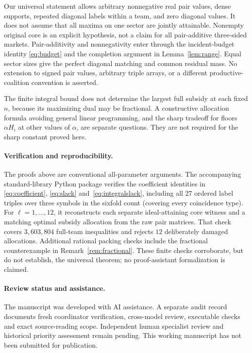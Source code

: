 \documentclass[11pt]{article}
\theoremstyle{remark}
\begin{document}
Our universal statement allows arbitrary nonnegative real pair values,
dense supports, repeated diagonal labels within a team, and zero diagonal
values. It does not assume that all maxima on one sector are jointly
attainable. Nonempty original core is an explicit hypothesis, not a
claim for all pair-additive three-sided markets. Pair-additivity and
nonnegativity enter through the incident-budget identity
\eqref{eq:budget} and the completion argument in Lemma~\ref{lem:range}.
Equal sector sizes give the perfect diagonal matching and common residual
mass. No extension to signed pair values, arbitrary triple arrays, or a
different productive-coalition convention is asserted.

The finite integral bound does not determine the largest full subsidy at
each fixed $n$, because its maximizing dual may be fractional. A constructive
allocation formula avoiding general linear programming, and the sharp
tradeoff for floors $\alpha H_i$ at other values of $\alpha$, are separate
questions. They are not required for the sharp constant proved here.

\paragraph{Verification and reproducibility.}
The proofs above are conventional all-parameter arguments. The accompanying
standard-library Python package verifies the coefficient identities in
\eqref{eq:coefficient}, \eqref{eq:slack} and~\eqref{eq:integralslack},
including all $27$ ordered label triples over three symbols in the sixfold
count (covering every coincidence type).
For $\ell=1,\ldots,12$, it reconstructs each separate ideal-attaining
core witness and a matching optimal subsidy allocation from the raw pair
matrices. That check covers $3{,}603{,}804$ full-team inequalities and rejects
$12$ deliberately damaged allocations. Additional rational packing checks
include the fractional counterexample in Remark~\ref{rem:fractional}.
These finite checks corroborate, but do not establish, the universal theorem;
no proof-assistant formalization is claimed.

\paragraph{Review status and assistance.}
The manuscript was developed with AI assistance. A separate audit record
documents fresh coordinator verification, cross-model review, executable
checks and exact source-reading scope. Independent human specialist review
and historical priority assessment remain pending. This working manuscript
has not been submitted for publication.
\end{document}

